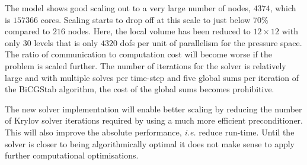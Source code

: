 \documentclass[review,times]{elsarticle}
\begin{document}
The model shows good scaling out to a very large number of nodes,
$4374$, which is $157366$ cores. Scaling starts to drop off at this
scale to just below $70\%$ compared to $216$ nodes. Here, the local
volume has been reduced to $12\times 12$ with only $30$ levels that is
only $4320$ dofs per unit of parallelism for the pressure space. The
ratio of communication to computation cost will become worse if the
problem is scaled further. The number of iterations for the
solver is relatively large and with multiple solves per time-step and
five global sums per iteration of the BiCGStab algorithm, the
cost of the global sums becomes prohibitive.

The new solver implementation will enable better scaling by reducing
the number of Krylov solver iterations required by using a much more
efficient preconditioner. This will also improve the absolute
performance, {\em i.e.} reduce run-time. Until the solver is closer to
being algorithmically optimal it does not make sense to apply further
computational optimisations.
\end{document}
